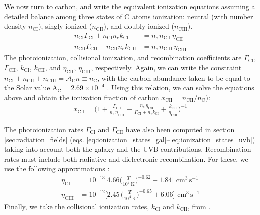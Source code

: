 We now turn to carbon, and write the equivalent ionization equations assuming a detailed balance among three states of C atoms ionization: neutral (with number density $n_{\mathrm{CI}}$), singly ionized ($n_{\mathrm{CII}}$), and doubly ionized ($n_{\mathrm{CIII}}$).
\begin{subequations}
\begin{align}
n_\mathrm{CI} \Gamma_{\mathrm{CI}} + n_\mathrm{CI} n_e k_{\mathrm{CI}} &=n_e\, n_\mathrm{CII} \,\eta_{\mathrm{CII}}\\
n_\mathrm{CII} \Gamma_{\mathrm{CII}} + n_\mathrm{CII} n_e k_{\mathrm{CII}}&=n_e\, n_\mathrm{CIII} \,\eta_{\mathrm{CIII}}
\end{align}
\end{subequations}
The photoionization, collisional ionization, and recombination coefficients are $\Gamma_{\mathrm{CI}}$, $\Gamma_{\mathrm{CII}}$, $k_\mathrm{CI}$, $k_\mathrm{CII}$, and $\eta_{\mathrm{CII}}$, $\eta_{\mathrm{CIII}}$, respectively. Again, we can write the constraint $n_\mathrm{CI}+n_\mathrm{CII}+n_\mathrm{CIII}=\mathcal{A}_\mathrm{C} n \equiv n_\mathrm{C}$, with the carbon abundance taken to be equal to the Solar value $\mathrm{A}_{\mathrm{C}} = 2.69 \times 10^{-4}$ \citep{asplund2009}. Using this relation, we can solve the equations above and obtain the ionization fraction of carbon $x_\mathrm{CII}= n_\mathrm{CII}/n_\mathrm{C})$:
\begin{align}
x_\mathrm{CII} = \bigg(1+\frac{\Gamma_{\mathrm{CII}}}{n_e\,\eta_{\mathrm{CIII}}}+\frac{n_e\,\eta_{\mathrm{CII}}}{\Gamma_{\mathrm{CI}}+n_e k_\mathrm{CI}}+ \frac{k_\mathrm{CII}}{\eta_\mathrm{CIII}}\bigg)^{-1} \label{eq:densityCII}
\end{align}

The photoionization rates $\Gamma_{\mathrm{CI}}$ and $\Gamma_{\mathrm{CII}}$ have also been computed in section \ref{sec:radiation_fields} (eqs. \ref{eq:ionization_states_gal}--\ref{eq:ionization_states_uvb}) taking into account both the galaxy and the UVB contributions. Recombination rates must include both radiative and dielectronic recombination. For these, we use the following approximations \citep{tielens2005book}: 
\begin{subequations}
\begin{align}
\eta_\mathrm{CII} &= 10^{-13} \bigg[ 4.66 \bigg(\frac{T}{10^4 \, \mathrm{K}}\bigg)^{-0.62} + 1.84  \bigg]\,\, \mathrm{cm}^3\, \mathrm{s}^{-1}\\
\eta_\mathrm{CIII} &=10^{-12} \bigg[ 2.45  \, \bigg(\frac{T}{10^4 \, \mathrm{K}}\bigg)^{-0.65} + 6.06 \bigg]\,\, \mathrm{cm}^3\, \mathrm{s}^{-1}
\end{align}
\end{subequations}
%
Finally, we take the collisional ionization rates, $k_\mathrm{CI}$ and $k_\mathrm{CII}$, from \citet[][Table 1]{voronov_practical_1997}.


